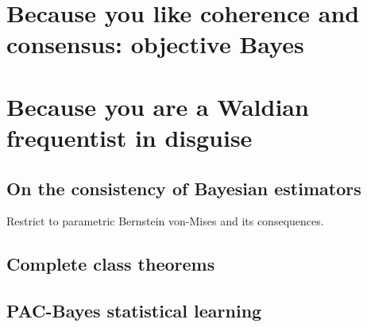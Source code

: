 
\section{Because you like coherence and consensus: objective Bayes}

\section{Because you are a Waldian frequentist in disguise}
\label{e:because_you_are_a_frequentist}

\subsection{On the consistency of Bayesian estimators}
Restrict to parametric Bernstein von-Mises and its consequences.

\subsection{Complete class theorems}

\subsection{PAC-Bayes statistical learning}



